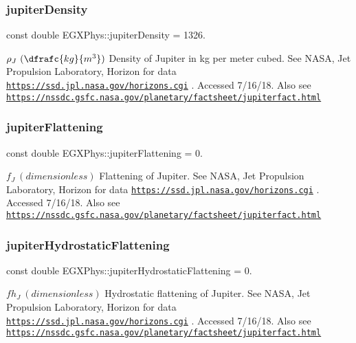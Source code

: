 \subsubsection{\texorpdfstring{jupiter\+Density}{jupiterDensity}}
{\footnotesize\ttfamily const double E\+G\+X\+Phys\+::jupiter\+Density = 1326.}

$\rho_{J} \ (\dfrafc{kg}{m^3})$ Density of Jupiter in kg per meter cubed. See N\+A\+SA, Jet Propulsion Laboratory, Horizon for data \href{https://ssd.jpl.nasa.gov/horizons.cgi}{\tt https\+://ssd.\+jpl.\+nasa.\+gov/horizons.\+cgi} . Accessed 7/16/18. Also see \href{https://nssdc.gsfc.nasa.gov/planetary/factsheet/jupiterfact.html}{\tt https\+://nssdc.\+gsfc.\+nasa.\+gov/planetary/factsheet/jupiterfact.\+html} \mbox{\label{namespace_e_g_x_phys_a6aa6094f390c1057f98af6d049a0f853}} 
\subsubsection{\texorpdfstring{jupiter\+Flattening}{jupiterFlattening}}
{\footnotesize\ttfamily const double E\+G\+X\+Phys\+::jupiter\+Flattening = 0.}

$f_{J} \ (dimensionless)$ Flattening of Jupiter. See N\+A\+SA, Jet Propulsion Laboratory, Horizon for data \href{https://ssd.jpl.nasa.gov/horizons.cgi}{\tt https\+://ssd.\+jpl.\+nasa.\+gov/horizons.\+cgi} . Accessed 7/16/18. Also see \href{https://nssdc.gsfc.nasa.gov/planetary/factsheet/jupiterfact.html}{\tt https\+://nssdc.\+gsfc.\+nasa.\+gov/planetary/factsheet/jupiterfact.\+html} \mbox{\label{namespace_e_g_x_phys_a7c18622d09bcb8cc8a7998ec1a453968}} 
\subsubsection{\texorpdfstring{jupiter\+Hydrostatic\+Flattening}{jupiterHydrostaticFlattening}}
{\footnotesize\ttfamily const double E\+G\+X\+Phys\+::jupiter\+Hydrostatic\+Flattening = 0.}

$ fh_{J} \ (dimensionless)$ Hydrostatic flattening of Jupiter. See N\+A\+SA, Jet Propulsion Laboratory, Horizon for data \href{https://ssd.jpl.nasa.gov/horizons.cgi}{\tt https\+://ssd.\+jpl.\+nasa.\+gov/horizons.\+cgi} . Accessed 7/16/18. Also see \href{https://nssdc.gsfc.nasa.gov/planetary/factsheet/jupiterfact.html}{\tt https\+://nssdc.\+gsfc.\+nasa.\+gov/planetary/factsheet/jupiterfact.\+html} \mbox{\label{namespace_e_g_x_phys_ab0b29a904521663fd0452458f3e06891}} 

